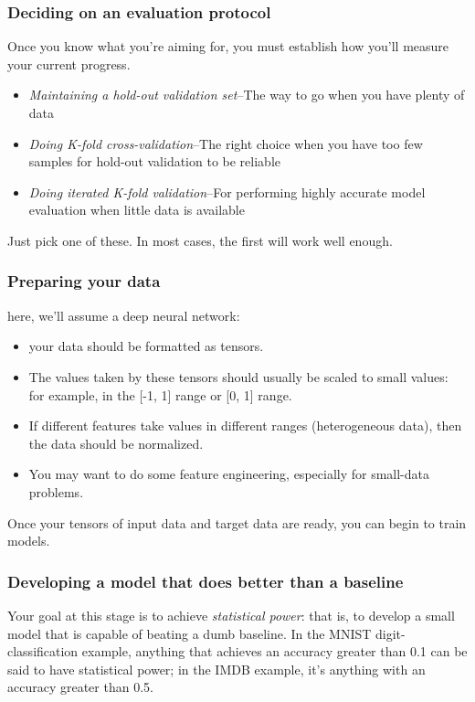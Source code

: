 \documentclass{article}
\numberwithin{equation}{section} %
\begin{document}
\subsubsection{Deciding on an evaluation protocol}

Once you know what you’re aiming for, you must establish how you’ll measure your
current progress.

\begin{itemize}
	\item \textit{Maintaining a hold-out validation set}--The way to go when you have plenty of data
	\item \textit{Doing K-fold cross-validation}--The right choice when you have too few samples for hold-out validation to be reliable
	\item \textit{Doing iterated K-fold validation}--For performing highly accurate model evaluation when little data is available
\end{itemize}

Just pick one of these. In most cases, the first will work well enough.


\subsubsection{Preparing your data}

here, we’ll assume a deep neural network:

\begin{itemize}
	\item your data should be formatted as tensors.
	\item The values taken by these tensors should usually be scaled to small values: for example, in the [-1, 1] range or [0, 1] range.
	\item If different features take values in different ranges (heterogeneous data), then the data should be normalized.
	\item You may want to do some feature engineering, especially for small-data problems.
\end{itemize}

Once your tensors of input data and target data are ready, you can begin to train models.

\subsubsection{Developing a model that does better than a baseline}

Your goal at this stage is to achieve \textit{statistical power}: that is, to develop a small model that is capable of beating a dumb baseline. In the MNIST digit-classification example, anything that achieves an accuracy greater than 0.1 can be said to have statistical power; in the IMDB example, it’s anything with an accuracy greater than 0.5. \\
\end{document}
